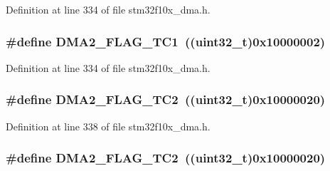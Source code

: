 Definition at line 334 of file stm32f10x\+\_\+dma.\+h.

\subsubsection[{\texorpdfstring{D\+M\+A2\+\_\+\+F\+L\+A\+G\+\_\+\+T\+C1}{DMA2_FLAG_TC1}}]{\setlength{\rightskip}{0pt plus 5cm}\#define D\+M\+A2\+\_\+\+F\+L\+A\+G\+\_\+\+T\+C1~(({\bf uint32\+\_\+t})0x10000002)}\hypertarget{group___d_m_a__flags__definition_ga828c97967dbdb48d267ed0f0c4e9b8a5}{}\label{group___d_m_a__flags__definition_ga828c97967dbdb48d267ed0f0c4e9b8a5}


Definition at line 334 of file stm32f10x\+\_\+dma.\+h.

\subsubsection[{\texorpdfstring{D\+M\+A2\+\_\+\+F\+L\+A\+G\+\_\+\+T\+C2}{DMA2_FLAG_TC2}}]{\setlength{\rightskip}{0pt plus 5cm}\#define D\+M\+A2\+\_\+\+F\+L\+A\+G\+\_\+\+T\+C2~(({\bf uint32\+\_\+t})0x10000020)}\hypertarget{group___d_m_a__flags__definition_ga7da2f61b8c67923904312796fd76def3}{}\label{group___d_m_a__flags__definition_ga7da2f61b8c67923904312796fd76def3}


Definition at line 338 of file stm32f10x\+\_\+dma.\+h.

\subsubsection[{\texorpdfstring{D\+M\+A2\+\_\+\+F\+L\+A\+G\+\_\+\+T\+C2}{DMA2_FLAG_TC2}}]{\setlength{\rightskip}{0pt plus 5cm}\#define D\+M\+A2\+\_\+\+F\+L\+A\+G\+\_\+\+T\+C2~(({\bf uint32\+\_\+t})0x10000020)}\hypertarget{group___d_m_a__flags__definition_ga7da2f61b8c67923904312796fd76def3}{}\label{group___d_m_a__flags__definition_ga7da2f61b8c67923904312796fd76def3}


